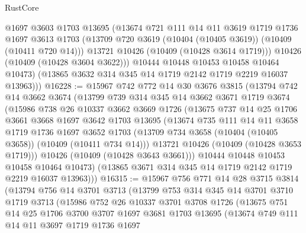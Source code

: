 \begin{lexlean}{RustCore}
\begin{coremodule}
            @1697
            @3603
            @1703
            @13695
            (@13674
              @721
              @111
              @14
              @11
              @3619
              @1719
              @1736
              @1697
              @3613
              @1703
              (@13709 @720 @3619 (@10404 (@10405 @3619)) (@10409 (@10411 @720 @14)))
              @13721
              @10426
              (@10409 (@10428 @3614 @1719)))
            @10426
            (@10409 (@10428 @3604 @3622)))
          @10444
          @10448
          @10453
          @10458
          @10464
          @10473)
        (@13865 @3632 @314 @345 @14 @1719 @2142 @1719 @2219 @16037 @13963)))
@16228 := @15967
    @742
    @772
    @14
    @30
    @3676
    @3815
    (@13794
      @742
      @14
      @3662
      @3674
      (@13799
        @739
        @314
        @345
        @14
        @3662
        @3671
        @1719
        @3674
        (@15986
          @738
          @26
          @10337
          @3662
          @3669
          @1726
          (@13675
            @737
            @14
            @25
            @1706
            @3661
            @3668
            @1697
            @3642
            @1703
            @13695
            (@13674
              @735
              @111
              @14
              @11
              @3658
              @1719
              @1736
              @1697
              @3652
              @1703
              (@13709 @734 @3658 (@10404 (@10405 @3658)) (@10409 (@10411 @734 @14)))
              @13721
              @10426
              (@10409 (@10428 @3653 @1719)))
            @10426
            (@10409 (@10428 @3643 @3661)))
          @10444
          @10448
          @10453
          @10458
          @10464
          @10473)
        (@13865 @3671 @314 @345 @14 @1719 @2142 @1719 @2219 @16037 @13963)))
@16315 := @15967
    @756
    @771
    @14
    @28
    @3715
    @3814
    (@13794
      @756
      @14
      @3701
      @3713
      (@13799
        @753
        @314
        @345
        @14
        @3701
        @3710
        @1719
        @3713
        (@15986
          @752
          @26
          @10337
          @3701
          @3708
          @1726
          (@13675
            @751
            @14
            @25
            @1706
            @3700
            @3707
            @1697
            @3681
            @1703
            @13695
            (@13674
              @749
              @111
              @14
              @11
              @3697
              @1719
              @1736
              @1697

\end{coremodule}
\end{lexlean}
